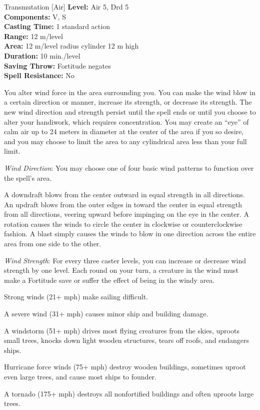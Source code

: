 {Transmutation [Air]}
{
	\textbf{Level:}
	Air 5, Drd 5\\
	\textbf{Components:}
	V, S\\
	\textbf{Casting Time:}
	1 standard action\\
	\textbf{Range:}
	12 m/level\\
	\textbf{Area:}
	12 m/level radius cylinder 12 m high\\
	\textbf{Duration:}
	10 min./level\\
	\textbf{Saving Throw:}
	Fortitude negates\\
	\textbf{Spell Resistance:}
	No\\
}
{
	You alter wind force in the area surrounding you. You can make the wind blow in a certain direction or manner, increase its strength, or decrease its strength. The new wind direction and strength persist until the spell ends or until you choose to alter your handiwork, which requires concentration. You may create an ``eye'' of calm air up to 24 meters in diameter at the center of the area if you so desire, and you may choose to limit the area to any cylindrical area less than your full limit.

	\textit{Wind Direction}:
	You may choose one of four basic wind patterns to function over the spell's area.


A downdraft blows from the center outward in equal strength in all directions.
An updraft blows from the outer edges in toward the center in equal strength from all directions, veering upward before impinging on the eye in the center.
A rotation causes the winds to circle the center in clockwise or counterclockwise fashion.
A blast simply causes the winds to blow in one direction across the entire area from one side to the other.

	\textit{Wind Strength}:
	For every three caster levels, you can increase or decrease wind strength by one level. Each round on your turn, a creature in the wind must make a Fortitude save or suffer the effect of being in the windy area.

	Strong winds (21+ mph) make sailing difficult.

	A severe wind (31+ mph) causes minor ship and building damage.

	A windstorm (51+ mph) drives most flying creatures from the skies, uproots small trees, knocks down light wooden structures, tears off roofs, and endangers ships.

	Hurricane force winds (75+ mph) destroy wooden buildings, sometimes uproot even large trees, and cause most ships to founder.

	A tornado (175+ mph) destroys all nonfortified buildings and often uproots large trees.

}
